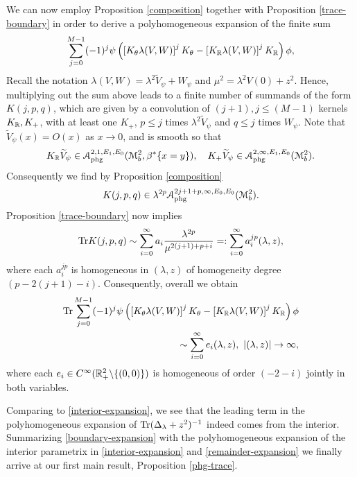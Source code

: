 We can now employ Proposition \ref{composition} together with Proposition \ref{trace-boundary}
in order to derive a polyhomogeneous expansion of the finite sum
\[
\sum_{j=0}^{M-1} (-1)^j \psi \left( \left[K_\theta \lambda(V,W)\right]^j 
K_\theta -  \left[K_\R \lambda(V,W)\right]^j K_\R \right) \phi, 
\]
Recall the notation $\lambda(V,W)=\lambda^2\widetilde{V}_\psi + W_\psi$
and $\mu^2=\lambda^2V(0)+z^2$. Hence, multiplying out the sum above leads to a finite number of 
summands of the form $K(j,p,q)$, which are given by a convolution of 
$(j+1), j\leq (M-1)$ kernels $K_\R, K_+$, with at least one $K_+$, 
$p\leq j$ times $\lambda^2 \widetilde{V}_\psi$ and $q\leq j$ times 
$W_\psi$. Note that $\widetilde{V}_\psi(x)=O(x)$ as $x\to 0$, and is smooth so that 
\begin{align*}
K_\R\widetilde{V}_\psi\in  \mathscr{A}_{\textup{phg}}^{2,1,E_1, E_0}(\mathscr{M}^2_b, \beta^*\{x=y\}),
\quad K_+\widetilde{V}_\psi\in  \mathscr{A}_{\textup{phg}}^{2,\infty,E_1, E_0}(\mathscr{M}^2_b). 
\end{align*}
Consequently we find by Proposition \ref{composition}
\[
K(j,p,q) \in \lambda^{2p} \mathscr{A}_{\textup{phg}}^{2j+1+p,\infty,E_0, 
E_0}(\mathscr{M}^2_b).
\]
Proposition \ref{trace-boundary} now implies 
\[
\textup{Tr} K(j,p,q) \sim \sum_{i=0}^\infty a_i \frac{\lambda^{2p}}
{\mu^{2(j+1)+p+i}} =: \sum_{i=0}^\infty a_i^{jp} (\lambda, z),
\]
where each $a_i^{jp}$ is homogeneous in $(\lambda, z)$ of homogeneity 
degree $(p-2(j+1)-i)$. Consequently, overall we obtain
\begin{equation}
\label{boundary-expansion}
 \begin{split}
\Tr \sum_{j=0}^{M-1} (-1)^j \psi \left( \left[K_\theta \lambda(V,W)\right]^j 
K_\theta -  \left[K_\R \lambda(V,W)\right]^j K_\R \right) \phi \\ 
\sim \sum_{i=0}^\infty e_i(\lambda,z), \ |(\lambda,z)| \to \infty,
 \end{split}
\end{equation}
where each $e_i\in C^{\infty}(\R^2_+\backslash \{(0,0)\})$ is homogeneous
of order $(-2-i)$ jointly in both variables.

Comparing to \eqref{interior-expansion}, we see that the leading term in the 
polyhomogeneous expansion of $\Tr(\Delta_\lambda+z^2)^{-1}$ indeed 
comes from the interior. Summarizing \eqref{boundary-expansion} with the polyhomogeneous expansion of 
the interior parametrix in \eqref{interior-expansion} and \eqref{remainder-expansion} we finally arrive at 
our first main result, Proposition \ref{phg-trace}.

